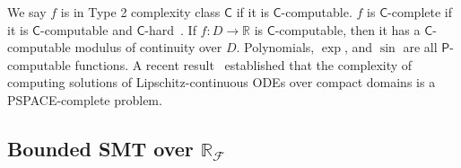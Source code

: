 \documentclass[prodmode]{acmsmall} %
\begin{document}
We say $f$ is in Type 2 complexity class $\mathsf{C}$ if it is $\mathsf{C}$-computable. $f$ is $\mathsf{C}$-complete if it is $\mathsf{C}$-computable and $\mathsf{C}$-hard~\cite{Kobook}. If $f:D\rightarrow \mathbb{R}$ is $\mathsf{C}$-computable, then it has a $\mathsf{C}$-computable modulus of continuity over $D$. Polynomials, $\exp$, and $\sin$ are all $\mathsf{P}$-computable functions. A recent result~\cite{Kawamura09} established that the complexity of computing solutions of Lipschitz-continuous ODEs over compact domains is a {\sf PSPACE}-complete problem. 
\subsection{Bounded SMT over $\mathbb{R}_{\mathcal{F}}$}
\end{document}
